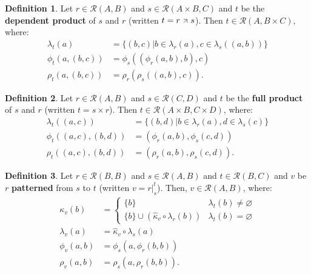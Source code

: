 \documentclass{article}
\theoremstyle{definition}
\newtheorem{definition}{Definition}[subsection]
\theoremstyle{plain}
\def\rule{\mathcal{R}}
\newcommand{\depp}{\mathbin{\: \, \mathclap{\tikz{
  \draw (-.20em, -.20em) -- (.20em, .20em);
  \draw (-.20em,  .20em) -- (.20em, .20em);
  \draw ( .20em, -.20em) -- (.20em, .20em);
}}\: \,}}
\begin{document}
\begin{definition}
  Let $ r \in \rule (A, B) $
  and $ s \in \rule (A \times B, C) $
  and $ t $ be the \textbf{dependent product} of $ s $ and $ r $
  (written $ t = r \depp s $).
  Then $ t \in \rule (A, B \times C) $, where:
  \begin{align}
    \lambda_t (a)         & = \{ (b, c) | b \in \lambda_r (a), c \in \lambda_s ((a, b)) \} \\
       \phi_t (a, (b, c)) & =    \phi_s ((\phi_r (a, b), b), c) \\
       \rho_t (a, (b, c)) & =    \rho_r (\rho_s ((a, b), c)). 
  \end{align}
\end{definition}

\begin{definition}
  Let $ r \in \rule (A, B) $
  and $ s \in \rule (C, D) $
  and $ t $ be the \textbf{full product} of $ s $ and $ r $
  (written $ t = s \times r $).
  Then $ t \in \rule (A \times B, C \times D) $, where:
  \begin{align}
    \lambda_t ((a, c))         & = \{ (b, d) | b \in \lambda_r (a), d \in \lambda_s (c) \} \\
       \phi_t ((a, c), (b, d)) & = (\phi_r (a, b), \phi_s (c, d)) \\
       \rho_t ((a, c), (b, d)) & = (\rho_r (a, b), \rho_s (c, d)).
  \end{align}
\end{definition}

\begin{definition}
  Let $ r \in \rule (B, B) $
  and $ s \in \rule (A, B) $
  and $ t \in \rule (B, C) $
  and $ v $ be $ r $ \textbf{patterned} from $ s $ to $ t $
  (written $ v = r \rvert_{s}^{t} $).
  Then, $ v \in \rule (A, B) $, where:
  \begin{align}
      \kappa_v (b) & = \begin{cases}
                         \{ b \}                                               & \lambda_t (b) \neq \varnothing \\
                         \{ b \} \cup (\widehat{\kappa}_v \circ \lambda_r (b)) & \lambda_t (b) =    \varnothing
                       \end{cases} \\
  \lambda_v (a)    & = \widehat{\kappa}_v \circ \lambda_s (a) \\
     \phi_v (a, b) & = \phi_s (a, \phi_r (b, b)) \\
     \rho_v (a, b) & = \rho_s (a, \rho_r (b, b)).
  \end{align}
\end{definition}
\end{document}
